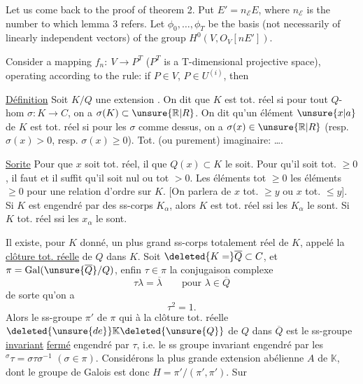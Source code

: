 Let us come back to the proof of theorem 2. Put $E'=n_{\mathcal E}E$, where $n_{\mathcal E}$ is the number to which lemma 3 refers. Let $\phi_0,\ldots,\phi_T$ be the basis (not necessarily of linearly independent vectors) of the group $H^0(V,O_V[nE'])$.

Consider a mapping $f_n:\ V\to P^T$ ($P^T$ is a T-dimensional projective space), operating according to the rule: if $P\in V$, $P\in U^{(i)}$, then

\uline{Définition} Soit $K/Q$ une extension  . On dit que $K$ est tot. réel si pour tout $Q$-hom $\sigma:K\to C$, on a $\sigma(K)\subset\unsure{\mathbb R|R}$. On dit qu'un élément $\unsure{x|a}$ de $K$ est tot. réel  si pour les $\sigma$ comme dessus, on a $\sigma(x)\in\unsure{\mathbb R|R}$ (resp. $\sigma(x)>0$, resp. $\sigma(x)\ge0$). Tot. (ou purement) imaginaire: \ldots.

\uline{Sorite} Pour que $x$ soit tot. réel, il  que $Q(x)\subset K$ le soit. Pour qu'il soit tot. $\ge0$, il faut et il suffit qu'il soit nul ou tot $>0$. Les éléments tot $\ge0$   les éléments $\ge0$ pour une relation d'ordre sur $K$. [On parlera de $x$ tot. $\ge y$ ou $x$ tot. $\le y$]. Si $K$ est engendré par des ss-corps $K_\alpha$, alors $K$ est tot. réel ssi les $K_\alpha$ le sont. Si  $K$ tot. réel ssi  les $x_\alpha$ le sont.

Il existe, pour $K$ donné, un plus grand ss-corps totalement réel de $K$, appelé la \uline{clôture tot. réelle} de $Q$ dans $K$. Soit $\deleted{K=}\overline Q\subset C$, et $\pi=\operatorname{Gal}(\unsure{\overline Q}/Q)$, enfin $\tau\in\pi$ la conjugaison complexe
\[
\tau\lambda=\overline\lambda\qquad\text{pour }\lambda\in\overline Q
\]
de sorte qu'on a
\[
\tau^2=1.
\]
Alors le ss-groupe $\pi'$ de $\pi$ qui   à la clôture tot. réelle $\deleted{\unsure{de}}\mathbb K\deleted{\unsure{Q}}$ de $Q$ dans $\overline Q$ est  le ss-groupe \uline{invariant} \uline{fermé} engendré par $\tau$, i.e. le ss groupe invariant engendré par les ${}^{\sigma}\tau=\sigma\tau\sigma^{-1}$ $(\sigma\in\pi)$.
Considérons la plus grande extension abélienne $A$ de $\mathbb K$, dont le groupe de Galois est donc $H=\pi'/(\pi',\pi')$.  Sur

